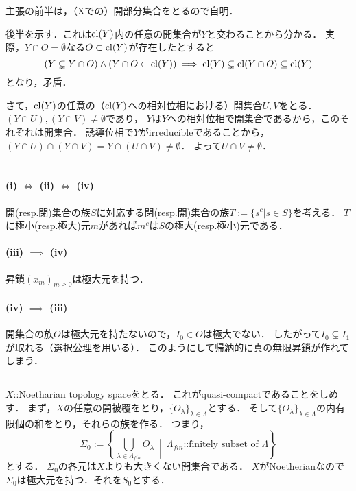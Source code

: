\documentclass[a4paper]{jarticle}
\begin{document}
    主張の前半は，（Xでの）開部分集合をとるので自明．

    後半を示す．これは$\operatorname{cl}(Y)$内の任意の開集合が$Y$と交わることから分かる．
    実際，$Y \cap O=\emptyset$なる$O \subset \operatorname{cl}(Y)$が存在したとすると
    \[ (Y \subsetneq Y \cap O) \land (Y \cap O \subset \operatorname{cl}(Y)) \implies \operatorname{cl}(Y) \subsetneq \operatorname{cl}(Y \cap O) \subseteq \operatorname{cl}(Y)\]
    となり，矛盾．

    さて，$\operatorname{cl}(Y)$の任意の（$\operatorname{cl}(Y)$への相対位相における）開集合$U, V$をとる．
    $(Y \cap U),(Y \cap V) \neq \emptyset$であり，
    $Y$は$Y$への相対位相で開集合であるから，このそれぞれは開集合．
    誘導位相で$Y$がirreducibleであることから，
    $(Y \cap U) \cap (Y \cap V)=Y \cap (U \cap V) \neq \emptyset$．
    よって$U \cap V \neq \emptyset$．

\section{}
\subsection{}
    \paragraph{(i) $\iff$ (ii) $\iff$ (iv)}
    開(resp.閉)集合の族$S$に対応する閉(resp.開)集合の族$T:=\{ s^c | s \in S \}$を考える．
    $T$に極小(resp.極大)元$m$があれば$m^c$は$S$の極大(resp.極小)元である．

    \paragraph{(iii) $\implies$ (iv)}
    昇鎖$(x_m)_{m \geq 0}$は極大元を持つ．

    \paragraph{(iv) $\implies$ (iii)}
    開集合の族$O$は極大元を持たないので，$I_0 \in O$は極大でない．
    したがって$I_0 \subsetneq I_1$が取れる（選択公理を用いる）．
    このようにして帰納的に真の無限昇鎖が作れてしまう．

\subsection{}
    $X$::Noetharian topology spaceをとる．
    これがquasi-compactであることをしめす．
    まず，$X$の任意の開被覆をとり，$\{O_{\lambda}\}_{\lambda \in \Lambda}$とする．
    そして$\{O_{\lambda}\}_{\lambda \in \Lambda}$の内有限個の和をとり，それらの族を作る．
    つまり，
    \[ \Sigma_0:=\left\{ \bigcup_{\lambda \in \Lambda_{fin}}O_{\lambda} ~\middle|~ \Lambda_{fin} \mbox{::finitely subset of }\Lambda \right\} \]
    とする．
    $\Sigma_0$の各元は$X$よりも大きくない開集合である．
    $X$がNoetherianなので$\Sigma_0$は極大元を持つ．それを$S_0$とする．
\end{document}
